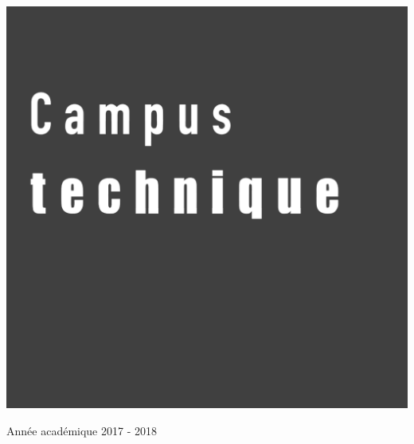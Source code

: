 \begin{center}
  \vspace{1cm}

  \includegraphics[scale=0.08]{textures/logo/technical_bw.pdf}

  \vspace{0.5cm}

  Année académique 2017 - 2018
\end{center}

\thispagestyle{empty}

